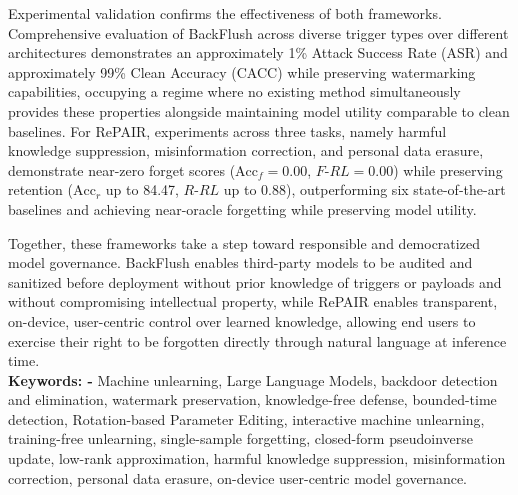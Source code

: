 \begin{Abstract}
Experimental validation confirms the effectiveness of both frameworks. Comprehensive evaluation of BackFlush across diverse trigger types over different architectures demonstrates an approximately 1\% Attack Success Rate (ASR) and approximately 99\% Clean Accuracy (CACC) while preserving watermarking capabilities, occupying a regime where no existing method simultaneously provides these properties alongside maintaining model utility comparable to clean baselines. For RePAIR, experiments across three tasks, namely harmful knowledge suppression, misinformation correction, and personal data erasure, demonstrate near-zero forget scores ($\mathrm{Acc}_f = 0.00$, $F\text{-}RL = 0.00$) while preserving retention ($\mathrm{Acc}_r$ up to 84.47, $R\text{-}RL$ up to 0.88), outperforming six state-of-the-art baselines and achieving near-oracle forgetting while preserving model utility.

Together, these frameworks take a step toward responsible and democratized model governance. BackFlush enables third-party models to be audited and sanitized before deployment without prior knowledge of triggers or payloads and without compromising intellectual property, while RePAIR enables transparent, on-device, user-centric control over learned knowledge, allowing end users to exercise their right to be forgotten directly through natural language at inference time.
\\
\textbf{Keywords: -} Machine unlearning, Large Language Models, backdoor detection and elimination, watermark preservation, knowledge-free defense, bounded-time detection, Rotation-based Parameter Editing, interactive machine unlearning, training-free unlearning, single-sample forgetting, closed-form pseudoinverse update, low-rank approximation, harmful knowledge suppression, misinformation correction, personal data erasure, on-device user-centric model governance.
\end{Abstract}